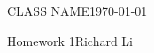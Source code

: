 \documentclass{article}
\newcommand{\homework}[1]{{\huge Homework #1\hfill Richard Li}}
\begin{document}
{\Large{CLASS NAME}\hfill \today}

\homework {1}
\end{document}

